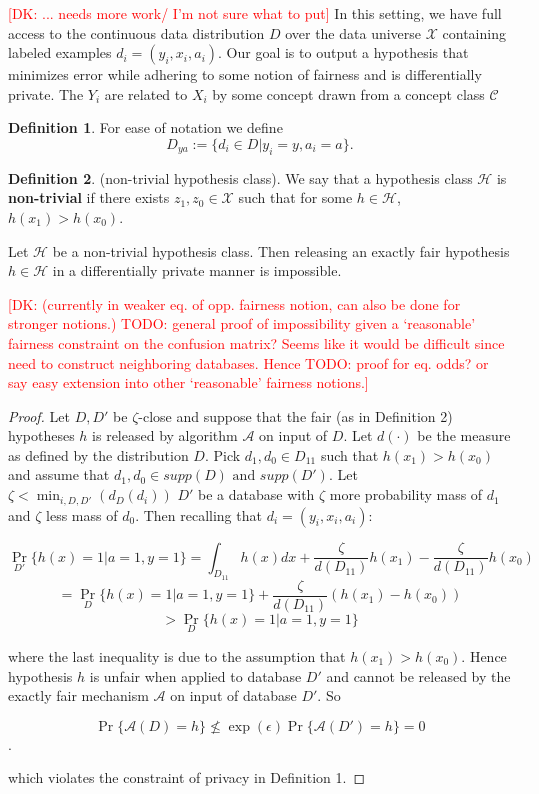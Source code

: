 \documentclass[format = sigconf]{acmart}
\newcommand{\dk}[1]{\textcolor{red}{[DK: #1]}}
\newcommand{\A}{\mathcal{A}}
\renewcommand{\H}{\mathcal{H}}
\renewcommand{\C}{\mathcal{C}}
\newcommand{\X}{\mathcal{X}}
\newcommand{\1}{\mathbbm{1}}
\newcommand{\eps}{\epsilon}
\newcommand{\zt}{\zeta}
\theoremstyle{definition}
\newtheorem{defn}{Definition}[section]
\begin{document}
\dk {... needs more work/ I'm not sure what to put}
In this setting, we have full access to the continuous data distribution $D$ over the data universe $\X$ containing labeled examples $d_i = (y_i,x_i,a_i)$. Our goal is to output a hypothesis that minimizes error while adhering to some notion of fairness and is differentially private. The $Y_i$ are related to $X_i$ by some concept drawn from a concept class $\C$




\begin{defn}
	For ease of notation we define
	$$D_{ya} := \{d_i \in D | y_i = y, a_i = a \}.$$
\end{defn}
\begin{defn}
	(non-trivial hypothesis class). We say that a hypothesis class $\H$ is {\bf non-trivial} if there exists $z_1, z_0 \in \mathcal{X}$ such that for some $h \in \H$, $h(x_1) > h(x_0)$.
\end{defn}
\begin{lemma}Let $\mathcal{H}$ be a non-trivial hypothesis class. Then releasing an exactly fair hypothesis $h\in \mathcal{H}$ in a differentially private manner is impossible.
\end{lemma}
\dk{ (currently in weaker eq. of opp. fairness notion, can also be done for stronger notions.) TODO: general proof of impossibility given a `reasonable' fairness constraint on the confusion matrix? Seems like it would be difficult since need to construct neighboring databases. Hence TODO: proof for eq. odds? or say easy extension into other `reasonable' fairness notions.}

\begin{proof}
	Let $D, D'$ be $\zt$-close and suppose that the fair (as in Definition 2) hypotheses $h$ is released by algorithm $\mathcal{A}$ on input of $D$. Let $d(\cdot)$ be the measure as defined by the distribution $D$. Pick $d_1, d_0 \in D_{11}$ such that $h(x_1) > h(x_0)$ and assume that $d_1, d_0 \in supp(D) \text{ and } supp(D')$. Let $\zt < \min_{i,D,D'}(d_{D}(d_i))$ $D'$ be a database with $\zt$ more probability mass of $d_1$ and $\zt$ less mass of $d_0$. Then recalling that $d_i = (y_i, x_i, a_i)$:

$$\Pr_{D'}\{h(x) = 1 | a = 1, y=1\} = \int_{D_{11}}h(x)dx + \frac{\zt}{d(D_{11})} h(x_1) - \frac{\zt}{d(D_{11})} h(x_0) $$
$$= \Pr_{D}\{h(x) = 1 | a = 1, y=1\} + \frac{\zt}{d(D_{11})} (h(x_1) - h(x_0))$$
$$>  \Pr_{D}\{h(x) = 1 | a = 1, y=1\}$$

where the last inequality is due to the assumption that $h(x_1) > h(x_0)$. Hence hypothesis $h$ is unfair when applied to database $D'$ and cannot be released by the exactly fair mechanism $\A$ on input of database $D'$. So

$$\Pr\{\mathcal{A}(D) = h\} \not\leq \exp(\eps)\Pr\{\mathcal{A}(D') = h\} = 0$$.

which violates the constraint of privacy in Definition 1.
\end{proof}
\end{document}
